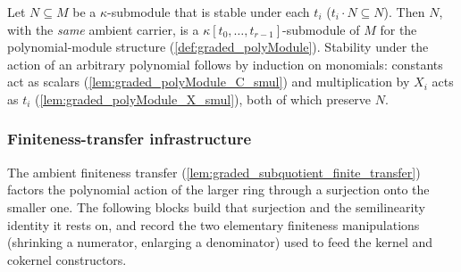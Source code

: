 \begin{definition}\leanok
  \label{def:graded_polySubmodule}
  Let \(N \subseteq M\) be a \(\kappa\)-submodule that is stable under each \(t_i\)
  (\(t_i \cdot N \subseteq N\)). Then \(N\), with the \emph{same} ambient carrier, is a
  \(\kappa[t_0, \dots, t_{r-1}]\)-submodule of \(M\) for the polynomial-module structure
  (\cref{def:graded_polyModule}). Stability under the action of an arbitrary polynomial
  follows by induction on monomials: constants act as scalars
  (\cref{lem:graded_polyModule_C_smul}) and multiplication by \(X_i\) acts as \(t_i\)
  (\cref{lem:graded_polyModule_X_smul}), both of which preserve \(N\).
\end{definition}


\subsubsection*{Finiteness-transfer infrastructure}

The ambient finiteness transfer (\cref{lem:graded_subquotient_finite_transfer})
factors the polynomial action of the larger ring through a surjection onto the
smaller one. The following blocks build that surjection and the semilinearity
identity it rests on, and record the two elementary finiteness manipulations
(shrinking a numerator, enlarging a denominator) used to feed the kernel and
cokernel constructors.

